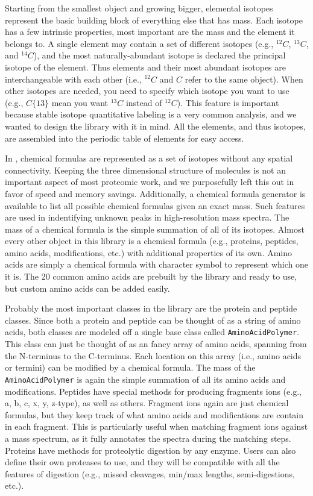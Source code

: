 Starting from the smallest object and growing bigger, elemental isotopes represent the basic building block of everything else that has mass. Each isotope has a few intrinsic properties, most important are the mass and the element it belongs to. A single element may contain a set of different isotopes (e.g., $^{12}C$, $^{13}C$, and $^{14}C$), and the most naturally-abundant isotope is declared the principal isotope of the element. Thus elements and their most abundant isotopes are interchangeable with each other (i.e., $^{12}C$ and $C$ refer to the same object). When other isotopes are needed, you need to specify which isotope you want to use (e.g., $C\{13\}$ mean you want $^{13}C$ instead of $^{12}C$). This feature is important because stable isotope quantitative labeling is a very common analysis, and we wanted to design the library with it in mind. All the elements, and thus isotopes, are assembled into the periodic table of elements for easy access.

In \csmsl{}, chemical formulas are represented as a set of isotopes without any spatial connectivity. Keeping the three dimensional structure of molecules is not an important aspect of most proteomic work, and we purposefully left this out in favor of speed and memory savings. Additionally, a chemical formula generator is available to list all possible chemical formulas given an exact mass. Such features are used in indentifying unknown peaks in high-resolution mass spectra. The mass of a chemical formula is the simple summation of all of its isotopes. Almost every other object in this library is a chemical formula (e.g., proteins, peptides, amino acids, modifications, etc.)  with additional properties of its own. Amino acids are simply a chemical formula with character symbol to represent which one it is. The 20 common amino acids are prebuilt by the library and ready to use, but custom amino acids can be added easily.

Probably the most important classes in the library are the protein and peptide classes. Since both a protein and peptide can be thought of as a string of amino acids, both classes are modeled off a single base class called \texttt{AminoAcidPolymer}. This class can just be thought of as an fancy array of amino acids, spanning from the N-terminus to the C-terminus. Each location on this array (i.e., amino acids or termini) can be modified by a chemical formula. The mass of the \texttt{AminoAcidPolymer} is again the simple summation of all its amino acids and modifications. Peptides have special methods for producing fragments ions (e.g., a, b, c, x, y, z-type), as well as others. Fragment ions again are just chemical formulas, but they keep track of what amino acids and modifications are contain in each fragment. This is particularly useful when matching fragment ions against a mass spectrum, as it fully annotates the spectra during the matching steps. Proteins have methods for proteolytic digestion by any enzyme. Users can also define their own proteases to use, and they will be compatible with all the features of digestion (e.g., missed cleavages, min/max lengths, semi-digestions, etc.).

